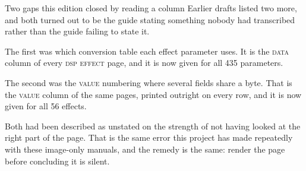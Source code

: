 \begin{note}{Two gaps this edition closed by reading a column}
Earlier drafts listed two more, and both turned out to be the guide stating something
nobody had transcribed rather than the guide failing to state it.

The first was which conversion table each effect parameter uses. It is the \textsc{data}
column of every \textsc{dsp effect} page, and it is now given for all 435 parameters.

The second was the \textsc{value} numbering where several fields share a byte. That is the
\textsc{value} column of the same pages, printed outright on every row, and it is now given
for all 56 effects.

Both had been described as unstated on the strength of not having looked at the right part
of the page. That is the same error this project has made repeatedly with these image-only
manuals, and the remedy is the same: render the page before concluding it is silent.
\end{note}

